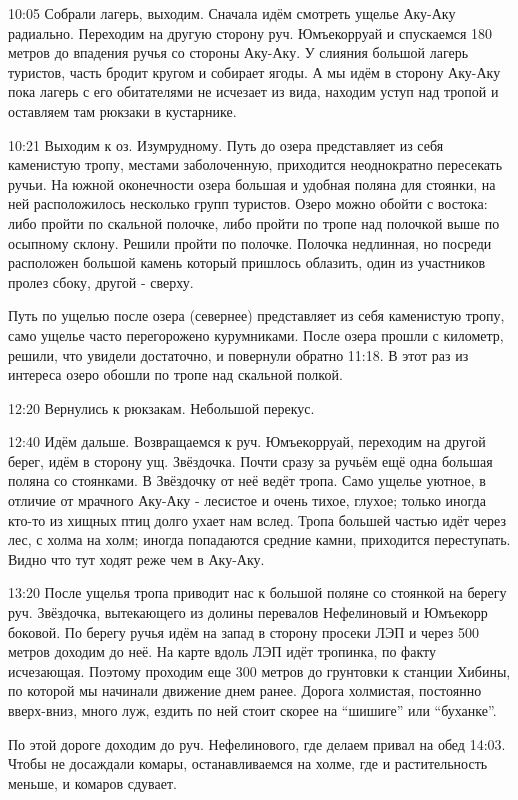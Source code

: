 10:05 Собрали лагерь, выходим. Сначала идём смотреть ущелье Аку-Аку радиально.
Переходим на другую сторону руч. Юмъекорруай и спускаемся 180 метров до впадения ручья со стороны Аку-Аку.
У слияния большой лагерь туристов, часть бродит кругом и собирает ягоды. А мы идём в сторону Аку-Аку пока лагерь
с его обитателями не исчезает из вида, находим уступ над тропой и оставляем там рюкзаки в кустарнике.

10:21 Выходим к оз. Изумрудному. Путь до озера представляет из себя каменистую тропу, местами заболоченную,
приходится неоднократно пересекать ручьи. На южной оконечности озера большая и удобная поляна для стоянки,
на ней расположилось несколько групп туристов. Озеро можно обойти с востока: либо пройти по скальной полочке,
либо пройти по тропе над полочкой выше по осыпному склону. Решили пройти по полочке.
Полочка недлинная, но посреди расположен большой камень который пришлось облазить, один из участников пролез сбоку,
другой - сверху.

Путь по ущелью после озера (севернее) представляет из себя каменистую тропу, само ущелье часто перегорожено курумниками.
После озера прошли с километр, решили, что увидели достаточно, и повернули обратно 11:18.
В этот раз из интереса озеро обошли по тропе над скальной полкой.

12:20 Вернулись к рюкзакам. Небольшой перекус.

12:40 Идём дальше. Возвращаемся к руч. Юмъекорруай, переходим на другой берег, идём в сторону ущ. Звёздочка.
Почти сразу за ручьём ещё одна большая поляна со стоянками. В Звёздочку от неё ведёт тропа.
Само ущелье уютное, в отличие от мрачного Аку-Аку - лесистое и очень тихое, глухое;
только иногда кто-то из хищных птиц долго ухает нам вслед. Тропа большей частью идёт через лес, с холма на холм;
иногда попадаются средние камни, приходится переступать. Видно что тут ходят реже чем в Аку-Аку.

13:20 После ущелья тропа приводит нас к большой поляне со стоянкой на берегу руч.
Звёздочка, вытекающего из долины перевалов Нефелиновый и Юмъекорр боковой.
По берегу ручья идём на запад в сторону просеки ЛЭП и через 500 метров доходим до неё.
На карте вдоль ЛЭП идёт тропинка, по факту исчезающая. Поэтому проходим еще 300 метров до грунтовки к станции Хибины,
по которой мы начинали движение днем ранее. Дорога холмистая, постоянно вверх-вниз, много луж,
ездить по ней стоит скорее на ``шишиге'' или ``буханке''.

По этой дороге доходим до руч. Нефелинового, где делаем привал на обед 14:03. Чтобы не досаждали комары,
останавливаемся на холме, где и растительность меньше, и комаров сдувает.

